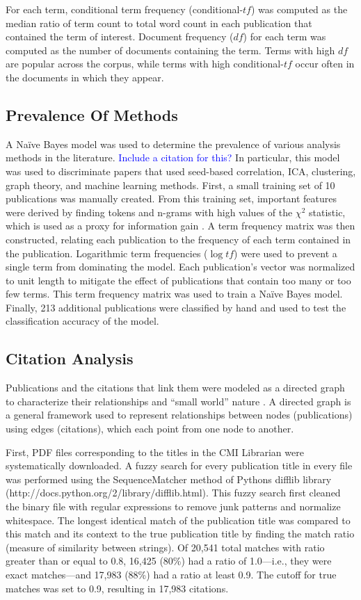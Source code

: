 \documentclass[5p]{elsarticle}
\begin{document}
For each term, conditional term frequency (conditional-$t\!f$) was computed as the
median ratio of term count to total word count in each publication that
contained the term of interest. Document frequency ($d\!f$) for each term was
computed as the number of documents containing the term. Terms with high $d\!f$ are
popular across the corpus, while terms with high conditional-$t\!f$ occur often in
the documents in which they appear.  

\subsection{Prevalence Of Methods} 
A Na\"ive Bayes model was used to determine the prevalence of various analysis
methods in the literature. \textcolor{blue}{Include a citation for this?} In particular, this model was used to discriminate
papers that used seed-based correlation, ICA, clustering, graph theory, and machine
learning methods. First, a small training set of 10 publications was manually
created.  From this training set, important features were derived by finding
tokens and n-grams with high values of the $\chi^2$ statistic, which is used as
a proxy for information gain \cite{Quinlan86}. A term
frequency matrix was then constructed, relating each publication to the
frequency of each term contained in the publication. Logarithmic term
frequencies ($\log{t\!f}$) were used to prevent a single term from dominating
the model.  Each publication’s vector was normalized to unit length to mitigate
the effect of publications that contain too many or too few terms. This term
frequency matrix was used to train a Na\"ive Bayes model. Finally, 213
additional publications were classified by hand and used to test the
classification accuracy of the model.

\subsection{Citation Analysis}
Publications and the citations that link them were modeled as a directed graph
to characterize their relationships and ``small world'' nature \cite{Watts1998}.
A directed graph is a general framework used to represent relationships between
nodes (publications) using edges (citations), which each point from one node to
another.

First, PDF files corresponding to the titles in the CMI Librarian were
systematically downloaded. A fuzzy search for every publication title in every
file was performed using the SequenceMatcher method of Pythons difflib library
(http://docs.python.org/2/library/difflib.html). This fuzzy search first cleaned
the binary file with regular expressions to remove junk patterns and normalize
whitespace. The longest identical match of the publication title was compared
to this match and its context to the true publication title by finding the match
ratio (measure of similarity between strings). Of 20,541 total matches with
ratio greater than or equal to 0.8, 16,425 (80\%) had a ratio of 1.0—i.e., they
were exact matches—and 17,983 (88\%) had a ratio at least 0.9. The cutoff for
true matches was set to 0.9, resulting in 17,983 citations. 
\end{document}
